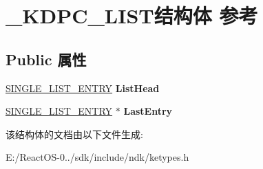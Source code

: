 \hypertarget{struct___k_d_p_c___l_i_s_t}{}\section{\+\_\+\+K\+D\+P\+C\+\_\+\+L\+I\+S\+T结构体 参考}
\label{struct___k_d_p_c___l_i_s_t}
\subsection*{Public 属性}
\begin{DoxyCompactItemize}
\item 
\mbox{\label{struct___k_d_p_c___l_i_s_t_a99401bcd087ab09bd0e103847e83b40f}} 
\hyperlink{struct___s_i_n_g_l_e___l_i_s_t___e_n_t_r_y}{S\+I\+N\+G\+L\+E\+\_\+\+L\+I\+S\+T\+\_\+\+E\+N\+T\+RY} {\bfseries List\+Head}
\item 
\mbox{\label{struct___k_d_p_c___l_i_s_t_a9d0ec1e1e9ba2b8ae69fdf33630d5837}} 
\hyperlink{struct___s_i_n_g_l_e___l_i_s_t___e_n_t_r_y}{S\+I\+N\+G\+L\+E\+\_\+\+L\+I\+S\+T\+\_\+\+E\+N\+T\+RY} $\ast$ {\bfseries Last\+Entry}
\end{DoxyCompactItemize}


该结构体的文档由以下文件生成\+:\begin{DoxyCompactItemize}
\item 
E\+:/\+React\+O\+S-\/0../sdk/include/ndk/ketypes.\+h\end{DoxyCompactItemize}
